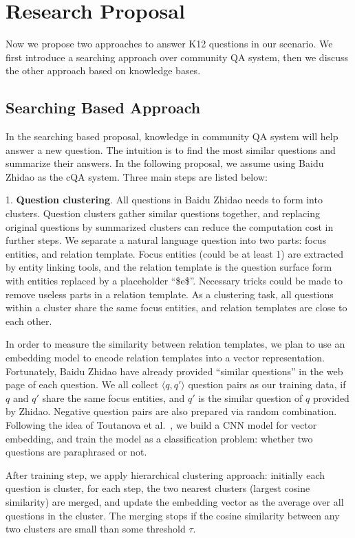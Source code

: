 \section{Research Proposal}

Now we propose two approaches to answer K12 questions in our scenario.
We first introduce a searching approach over community QA system, then we discuss
the other approach based on knowledge bases.

\subsection{Searching Based Approach}

In the searching based proposal, knowledge in community QA system will
help answer a new question. The intuition is to find the most similar questions
and summarize their answers.
In the following proposal, we assume using Baidu Zhidao as the cQA system.
Three main steps are listed below:

1. \textbf{Question clustering}. All questions in Baidu Zhidao needs to form into clusters.
Question clusters gather similar questions together, and replacing original questions by
summarized clusters can reduce the computation cost in further steps.
We separate a natural language question into two parts: focus entities, and relation template.
Focus entities (could be at least 1) are extracted by entity linking tools, and the relation template
is the question surface form with entities replaced by a placeholder ``\$e\$''.
Necessary tricks could be made to remove useless parts in a relation template.
As a clustering task, all questions within a cluster share the same focus entities,
and relation templates are close to each other.

In order to measure the similarity between relation templates, we plan to use an embedding model
to encode relation templates into a vector representation.
Fortunately, Baidu Zhidao have already provided ``similar questions'' in the web page of each question.
We all collect $\langle q, q' \rangle$ question pairs as our training data, if $q$ and $q'$ share the same
focus entities, and $q'$ is the similar question of $q$ provided by Zhidao.
Negative question pairs are also prepared via random combination.
Following the idea of Toutanova et al.~,
we build a CNN model for vector embedding, and train the model as a classification problem:
whether two questions are paraphrased or not.

After training step, we apply hierarchical clustering approach: initially each question is cluster,
for each step, the two nearest clusters (largest cosine similarity) are merged,
and update the embedding vector as the average over all questions in the cluster.
The merging stops if the cosine similarity between any two clusters are small than some threshold $\tau$.

